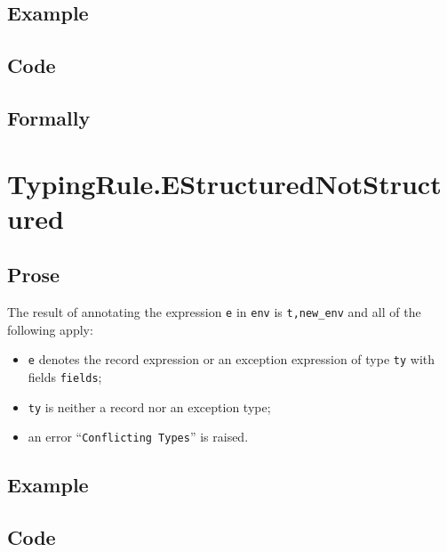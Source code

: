 \documentclass{book}
\begin{document}
  \subsection{Example}

  \subsection{Code}

\begin{emptyformal}
    \subsection{Formally}
\end{emptyformal}


\section{TypingRule.EStructuredNotStructured \label{sec:TypingRule.EStructuredNotStructured}}

  \subsection{Prose}
  The result of annotating the expression \texttt{e} in \texttt{env} is
\texttt{t,new\_env} and all of the following apply:
  \begin{itemize}
  \item \texttt{e} denotes the record expression or an exception expression of type \texttt{ty} with fields \texttt{fields};
  \item \texttt{ty} is neither a record nor an exception type;
  \item an error ``\texttt{Conflicting Types}'' is raised.
  \end{itemize}

  \subsection{Example}

  \subsection{Code}
\end{document}
